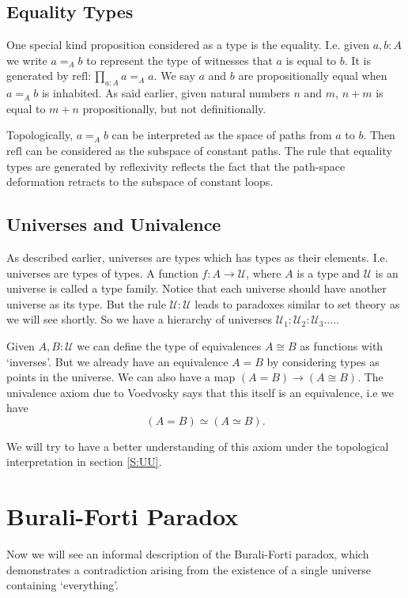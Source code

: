 \documentclass[10pt]{article}
\theoremstyle{definition}
\theoremstyle{plain}
\theoremstyle{remark}
\newcommand{\U}{\mathscr{U}}
\begin{document}
\subsection{Equality Types}
One special kind proposition considered as a type is the equality. I.e. given $a,b : A$ we
write $a =_A b$ to represent the type of witnesses that $a$ is equal to $b$. It is
generated by $\text{refl} :\prod_{a : A} a =_A a$. We say $a$ and
$b$ are propositionally equal when $a =_A b$ is inhabited. As said earlier, given natural
numbers $n$ and $m$, $n+m$ is equal to $m+n$ propositionally, but not definitionally.
\smallskip

Topologically, $a =_A b$ can be interpreted as the space of paths from $a$ to $b$. Then 
$\text{refl}$ can be considered as the subspace of constant paths. The rule that equality
types are generated by reflexivity reflects the fact that the path-space deformation retracts
to the subspace of constant loops. 

\subsection{Universes and Univalence}

As described earlier, universes are types which has types as their elements. I.e. universes
are types of types. A function $f : A \to \U$, where $A$ is a type and $\U$ is an universe
is called a type family. Notice that each universe should have another universe as its type.
But the rule $\U : \U$ leads to paradoxes similar to set theory as we will see shortly. 
So we have a hierarchy of universes $\U_1 : \U_2 : \U_3 \dots $.\smallskip.

Given $A, B:\U$ we can define the type of equivalences $A\cong B$ as functions
with `inverses'. But we already have an equivalence $A = B$ by considering types as points
in the universe. We can also have a map $(A = B) \to (A \cong B)$. The univalence axiom 
due to Voedvosky says that this itself is an equivalence, i.e we have
\[ (A = B) \simeq (A \simeq B).\]

We will try to have a better understanding of this axiom under the topological interpretation
in section \ref{S:UU}.

\section{Burali-Forti Paradox}\label{S:BFP}

Now we will see an informal description of the Burali-Forti paradox, which demonstrates a
contradiction arising from the existence of a single universe containing `everything'.\smallskip
\end{document}
